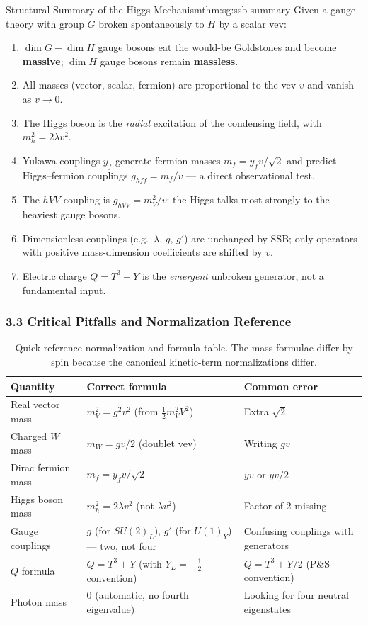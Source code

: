 \documentclass[12pt,a4paper]{article}
\newcommand{\thm}[3][]{\begin{Theorem}{#2}{#1}#3\end{Theorem}}
\begin{document}
\thm[thm:sg:ssb-summary]{Structural Summary of the Higgs Mechanism}{
  Given a gauge theory with group $G$ broken spontaneously to $H$ by a scalar vev:
  \begin{enumerate}
    \item $\dim G - \dim H$ gauge bosons eat the would-be Goldstones and become \textbf{massive}; $\dim H$ gauge bosons remain \textbf{massless}.
    \item All masses (vector, scalar, fermion) are proportional to the vev $v$ and vanish as $v\to0$.
    \item The Higgs boson is the \emph{radial} excitation of the condensing field, with $m_h^2 = 2\lambda v^2$.
    \item Yukawa couplings $y_f$ generate fermion masses $m_f = y_f v/\sqrt{2}$ and predict Higgs--fermion couplings $g_{hff} = m_f/v$ — a direct observational test.
    \item The $hVV$ coupling is $g_{hVV} = m_V^2/v$: the Higgs talks most strongly to the heaviest gauge bosons.
    \item Dimensionless couplings (e.g.\ $\lambda$, $g$, $g'$) are unchanged by SSB; only operators with positive mass-dimension coefficients are shifted by $v$.
    \item Electric charge $Q = T^3 + Y$ is the \emph{emergent} unbroken generator, not a fundamental input.
  \end{enumerate}
}

\subsubsection*{3.3 \quad Critical Pitfalls and Normalization Reference}

\begin{table}[ht]
\centering
\renewcommand{\arraystretch}{1.5}
\begin{tabular}{lll}
\toprule
Quantity & Correct formula & Common error \\
\midrule
Real vector mass & $m_V^2 = g^2v^2$ (from $\tfrac{1}{2}m_V^2 V^2$) & Extra $\sqrt{2}$ \\
Charged $W$ mass & $m_W = gv/2$ (doublet vev) & Writing $gv$ \\
Dirac fermion mass & $m_f = y_f v/\sqrt{2}$ & $yv$ or $yv/2$ \\
Higgs boson mass & $m_h^2 = 2\lambda v^2$ (not $\lambda v^2$) & Factor of 2 missing \\
Gauge couplings & $g$ (for $SU(2)_L$), $g'$ (for $U(1)_Y$) — two, not four & Confusing couplings with generators \\
$Q$ formula & $Q = T^3 + Y$ (with $Y_{L} = -\tfrac{1}{2}$ convention) & $Q = T^3 + Y/2$ (P\&S convention) \\
Photon mass & $0$ (automatic, no fourth eigenvalue) & Looking for four neutral eigenstates \\
\bottomrule
\end{tabular}
\caption{Quick-reference normalization and formula table. The mass formulae differ by spin because the canonical kinetic-term normalizations differ.}
\label{tab:sg:pitfalls}
\end{table}
\end{document}
